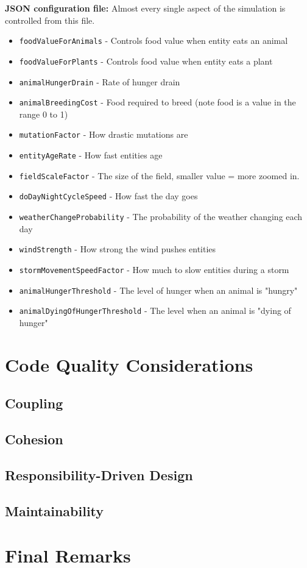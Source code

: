 \documentclass[10pt, a4paper]{scrartcl}
\begin{document}
\begin{multicols}{2}
    \noindent \textbf{JSON configuration file: } Almost every single aspect of the simulation is controlled from this file.
    \begin{itemize}
      \item \verb|foodValueForAnimals| - Controls food value when entity eats an animal
      \item \verb|foodValueForPlants| - Controls food value when entity eats a plant
      \item \verb|animalHungerDrain| - Rate of hunger drain
      \item \verb|animalBreedingCost| - Food required to breed (note food is a value in the range 0 to 1)
      \item \verb|mutationFactor| - How drastic mutations are
      \item \verb|entityAgeRate| - How fast entities age
      \item \verb|fieldScaleFactor|  - The size of the field, smaller value = more zoomed in.
      \item \verb|doDayNightCycleSpeed| - How fast the day goes
      \item \verb|weatherChangeProbability| - The probability of the weather changing each day
      \item \verb|windStrength| - How strong the wind pushes entities
      \item \verb|stormMovementSpeedFactor| - How much to slow entities during a storm
      \item \verb|animalHungerThreshold| -  The level of hunger when an animal is "hungry"
      \item \verb|animalDyingOfHungerThreshold| - The level when an animal is "dying of hunger"
    \end{itemize}

    \section{Code Quality Considerations}

    \subsection{Coupling}


    \subsection{Cohesion}


    \subsection{Responsibility-Driven Design}


    \subsection{Maintainability}


    \section{Final Remarks}


  \end{multicols}
\end{document}
